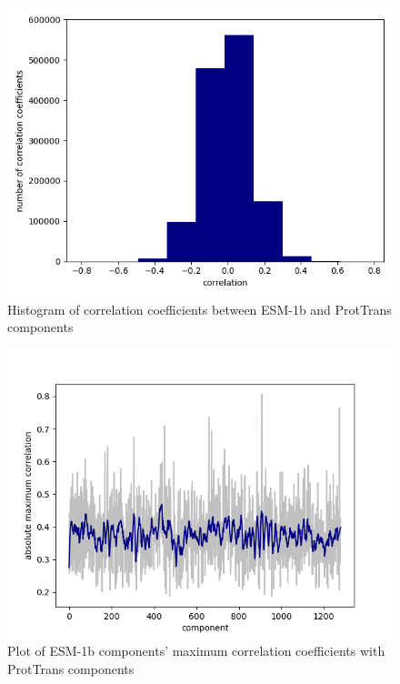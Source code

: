 \documentclass[12pt]{article}
\begin{document}
	\begin{figure}[h!]
		\centering
		\includegraphics[scale=0.85]{validation_small_set_2_joined_correlation_hist.png}

		\caption{Histogram of correlation coefficients between ESM-1b 
		and ProtTrans components}
		\label{figure:correlationComponentsHisto}
	\end{figure}

	\newpage

	\begin{figure}[h!]
		\centering
		\includegraphics[scale=0.85]{validation_small_set_2_joined_correlation_max.png}

		\caption{Plot of ESM-1b components' maximum correlation coefficients with 
		ProtTrans components}
		\label{figure:correlationComponentsMax}
	\end{figure}
\end{document}
